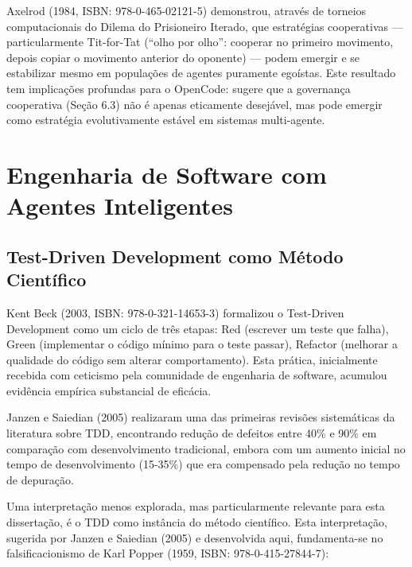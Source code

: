 Axelrod (1984, ISBN: 978-0-465-02121-5) demonstrou, através de torneios computacionais do Dilema do Prisioneiro Iterado, que estratégias cooperativas — particularmente Tit-for-Tat (``olho por olho'': cooperar no primeiro movimento, depois copiar o movimento anterior do oponente) — podem emergir e se estabilizar mesmo em populações de agentes puramente egoístas. Este resultado tem implicações profundas para o OpenCode: sugere que a governança cooperativa (Seção 6.3) não é apenas eticamente desejável, mas pode emergir como estratégia evolutivamente estável em sistemas multi-agente.

\section{Engenharia de Software com Agentes Inteligentes}

\subsection{Test-Driven Development como Método Científico}

Kent Beck (2003, ISBN: 978-0-321-14653-3) formalizou o Test-Driven Development como um ciclo de três etapas: Red (escrever um teste que falha), Green (implementar o código mínimo para o teste passar), Refactor (melhorar a qualidade do código sem alterar comportamento). Esta prática, inicialmente recebida com ceticismo pela comunidade de engenharia de software, acumulou evidência empírica substancial de eficácia.

Janzen e Saiedian (2005)  realizaram uma das primeiras revisões sistemáticas da literatura sobre TDD, encontrando redução de defeitos entre 40\% e 90\% em comparação com desenvolvimento tradicional, embora com um aumento inicial no tempo de desenvolvimento (15-35\%) que era compensado pela redução no tempo de depuração.

Uma interpretação menos explorada, mas particularmente relevante para esta dissertação, é o TDD como instância do método científico. Esta interpretação, sugerida por Janzen e Saiedian (2005) e desenvolvida aqui, fundamenta-se no falsificacionismo de Karl Popper (1959, ISBN: 978-0-415-27844-7):

